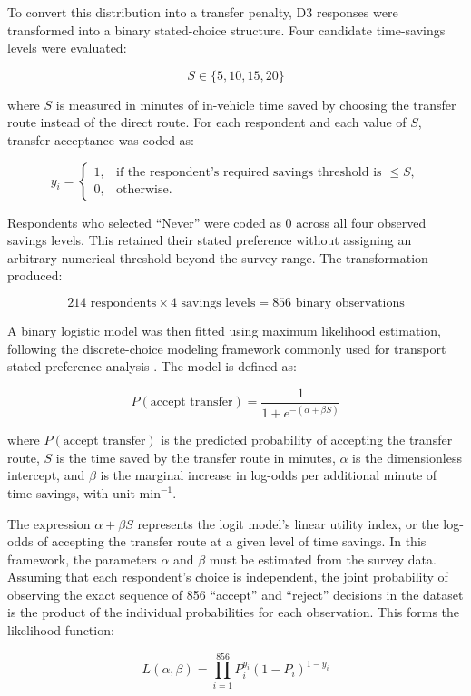 {To convert this distribution into a transfer penalty, D3 responses were transformed into a binary stated-choice structure. Four candidate time-savings levels were evaluated:

\[
S \in \{5,10,15,20\}
\]

where $S$ is measured in minutes of in-vehicle time saved by choosing the transfer route instead of the direct route. For each respondent and each value of $S$, transfer acceptance was coded as:

\[
y_i =
\begin{cases}
1, & \text{if the respondent's required savings threshold is } \le S, \\
0, & \text{otherwise.}
\end{cases}
\]

Respondents who selected ``Never'' were coded as 0 across all four observed savings levels. This retained their stated preference without assigning an arbitrary numerical threshold beyond the survey range. The transformation produced:

\[
214 \text{ respondents} \times 4 \text{ savings levels} = 856 \text{ binary observations}
\]

A binary logistic model was then fitted using maximum likelihood estimation, following the discrete-choice modeling framework commonly used for transport stated-preference analysis \cite{benakiva1985discrete,train2009discrete}. The model is defined as:

\[
P(\text{accept transfer}) = \frac{1}{1+e^{-(\alpha+\beta S)}}
\]

where $P(\text{accept transfer})$ is the predicted probability of accepting the transfer route, $S$ is the time saved by the transfer route in minutes, $\alpha$ is the dimensionless intercept, and $\beta$ is the marginal increase in log-odds per additional minute of time savings, with unit $\text{min}^{-1}$.

The expression $\alpha+\beta S$ represents the logit model's linear utility index, or the log-odds of accepting the transfer route at a given level of time savings. In this framework, the parameters $\alpha$ and $\beta$ must be estimated from the survey data. Assuming that each respondent's choice is independent, the joint probability of observing the exact sequence of 856 ``accept'' and ``reject'' decisions in the dataset is the product of the individual probabilities for each observation. This forms the likelihood function:

\[
L(\alpha,\beta)=\prod_{i=1}^{856} P_i^{y_i}(1-P_i)^{1-y_i}
\]

}
